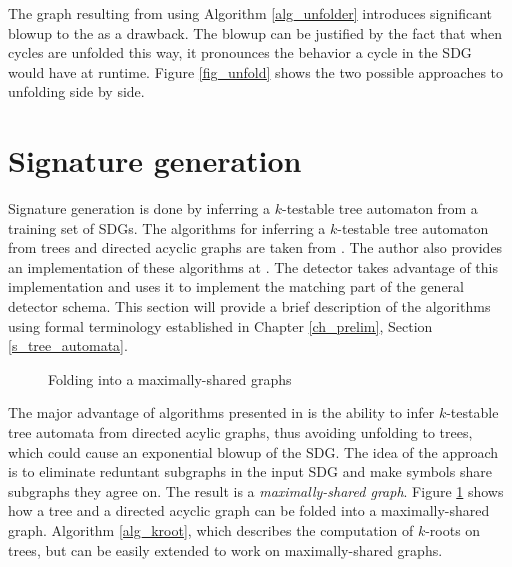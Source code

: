 The graph resulting from using Algorithm \ref{alg_unfolder} introduces significant blowup to the  as a drawback. The blowup can be justified by the fact that when cycles are unfolded this way, it pronounces the behavior a cycle in the \textsc{SDG} would have at runtime. Figure \ref{fig_unfold} shows the two possible approaches to unfolding side by side.

\section{Signature generation}
\label{s_inference}
Signature generation is done by inferring a $k$-testable tree automaton from a training set of \textsc{SDG}s. The algorithms for inferring a $k$-testable tree automaton from trees and directed acyclic graphs are taken from \cite{Babic11}. The author also provides an implementation of these algorithms at \cite{BabicWWW}. The detector takes advantage of this implementation and uses it to implement the matching part of the general detector schema.
This section will provide a brief description of the algorithms using formal terminology established in Chapter \ref{ch_prelim}, Section \ref{s_tree_automata}.

\begin{figure}[H]
    \centering
    \caption{Folding into a maximally-shared graphs}
    \label{fig_msg}
\end{figure}

The major advantage of algorithms presented in \cite{Babic11} is the ability to infer $k$-testable tree automata from directed acylic graphs, thus avoiding unfolding to trees, which could cause an exponential blowup of the \textsc{SDG}. The idea of the approach is to eliminate reduntant subgraphs in the input \textsc{SDG} and make symbols share subgraphs they agree on. The result is a \emph{maximally-shared graph}.
Figure \ref{fig_msg} shows how a tree and a directed acyclic graph can be folded into a maximally-shared graph. Algorithm \ref{alg_kroot}, which describes the computation of $k$-roots on trees, but can be easily extended to work on maximally-shared graphs.

